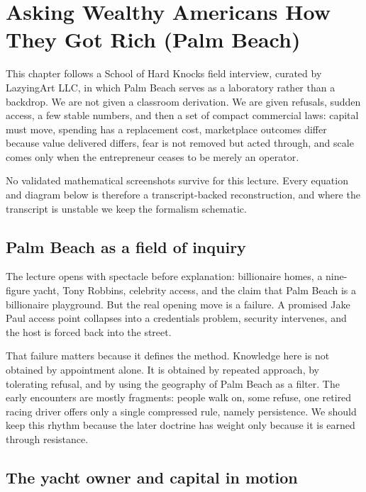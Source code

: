 \chapter{Asking Wealthy Americans How They Got Rich (Palm Beach)}

This chapter follows a School of Hard Knocks field interview, curated by LazyingArt LLC, in which Palm Beach serves as a laboratory rather than a backdrop. We are not given a classroom derivation. We are given refusals, sudden access, a few stable numbers, and then a set of compact commercial laws: capital must move, spending has a replacement cost, marketplace outcomes differ because value delivered differs, fear is not removed but acted through, and scale comes only when the entrepreneur ceases to be merely an operator.

\begin{remark}
No validated mathematical screenshots survive for this lecture. Every equation and diagram below is therefore a transcript-backed reconstruction, and where the transcript is unstable we keep the formalism schematic.
\end{remark}

\section{Palm Beach as a field of inquiry}

The lecture opens with spectacle before explanation: billionaire homes, a nine-figure yacht, Tony Robbins, celebrity access, and the claim that Palm Beach is a billionaire playground. But the real opening move is a failure. A promised Jake Paul access point collapses into a credentials problem, security intervenes, and the host is forced back into the street.

That failure matters because it defines the method. Knowledge here is not obtained by appointment alone. It is obtained by repeated approach, by tolerating refusal, and by using the geography of Palm Beach as a filter. The early encounters are mostly fragments: people walk on, some refuse, one retired racing driver offers only a single compressed rule, namely persistence. We should keep this rhythm because the later doctrine has weight only because it is earned through resistance.

\section{The yacht owner and capital in motion}

